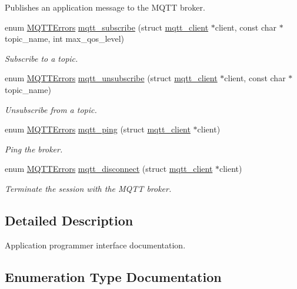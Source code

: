 \begin{DoxyCompactItemize}
\begin{DoxyCompactList}
Publishes an application message to the M\+Q\+TT broker. \end{DoxyCompactList}\item 
enum \hyperlink{group__api_gad0c901a8d30691ed0ca17915b691b7e7}{M\+Q\+T\+T\+Errors} \hyperlink{group__api_gaea5da9b546f6e91eb77c9eff9c478de5}{mqtt\+\_\+subscribe} (struct \hyperlink{structmqtt__client}{mqtt\+\_\+client} $\ast$client, const char $\ast$topic\+\_\+name, int max\+\_\+qos\+\_\+level)
\begin{DoxyCompactList}\small\item\em Subscribe to a topic. \end{DoxyCompactList}\item 
enum \hyperlink{group__api_gad0c901a8d30691ed0ca17915b691b7e7}{M\+Q\+T\+T\+Errors} \hyperlink{group__api_ga08d16571dfefa690698c0cca5cca7a1d}{mqtt\+\_\+unsubscribe} (struct \hyperlink{structmqtt__client}{mqtt\+\_\+client} $\ast$client, const char $\ast$topic\+\_\+name)
\begin{DoxyCompactList}\small\item\em Unsubscribe from a topic. \end{DoxyCompactList}\item 
enum \hyperlink{group__api_gad0c901a8d30691ed0ca17915b691b7e7}{M\+Q\+T\+T\+Errors} \hyperlink{group__api_gae472795684a1d973bfb89d075d17a29e}{mqtt\+\_\+ping} (struct \hyperlink{structmqtt__client}{mqtt\+\_\+client} $\ast$client)
\begin{DoxyCompactList}\small\item\em Ping the broker. \end{DoxyCompactList}\item 
enum \hyperlink{group__api_gad0c901a8d30691ed0ca17915b691b7e7}{M\+Q\+T\+T\+Errors} \hyperlink{group__api_ga95d9981735ab4495d3d65e8056611126}{mqtt\+\_\+disconnect} (struct \hyperlink{structmqtt__client}{mqtt\+\_\+client} $\ast$client)
\begin{DoxyCompactList}\small\item\em Terminate the session with the M\+Q\+TT broker. \end{DoxyCompactList}\end{DoxyCompactItemize}


\subsection{Detailed Description}
Application programmer interface documentation. 



\subsection{Enumeration Type Documentation}
